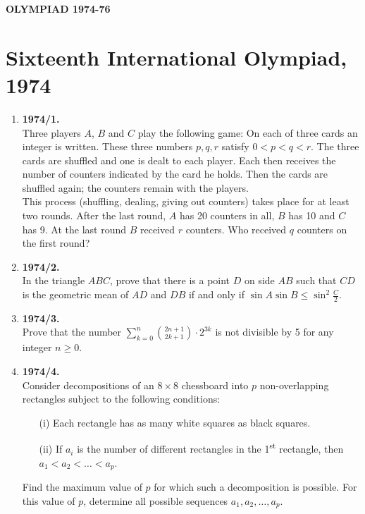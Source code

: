 \documentclass{article}
\begin{document}
\pagestyle{fancy}
\fancyhf{}

\begin{center}
\textbf{OLYMPIAD 1974-76}
\end{center}
\section*{Sixteenth International Olympiad, 1974}
\begin{enumerate}
\item\textbf{1974/1.} \\
Three players $A$, $B$ and $C$ play the following game: On each of three cards an integer is written. These three numbers $p, q, r$ satisfy $0 < p < q < r$. The three cards are shuffled and one is dealt to each player. Each then receives the number of counters indicated by the card he holds. Then the cards are shuffled again; the counters remain with the players. \\
This process (shuffling, dealing, giving out counters) takes place for at least two rounds. After the last round, $A$ has 20 counters in all, $B$ has 10 and $C$ has 9. At the last round $B$ received $r$ counters. Who received $q$ counters on the first round?

\bigskip

\item\textbf{1974/2.} \\
In the triangle $ABC$, prove that there is a point $D$ on side $AB$ such that $CD$ is the geometric mean of $AD$ and $DB$ if and only if
$
\sin A \sin B \leq \sin^2 \frac{C}{2}.
$

\bigskip

\item\textbf{1974/3.} \\
Prove that the number
$
\sum_{k=0}^{n} \binom{2n+1}{2k+1} \cdot 2^{3k}
$
is not divisible by 5 for any integer $n \geq 0$.

\bigskip

\item\textbf{1974/4.} \\
Consider decompositions of an $8 \times 8$ chessboard into $p$ non-overlapping rectangles subject to the following conditions:
\begin{itemize}
  \item[(i)] Each rectangle has as many white squares as black squares.
  \item[(ii)] If $a_i$ is the number of different rectangles in the 1\textsuperscript{st} rectangle, then $a_1 < a_2 < \dots < a_p$. 
\end{itemize}
Find the maximum value of $p$ for which such a decomposition is possible. For this value of $p$, determine all possible sequences $a_1, a_2, \dots, a_p$.


\end{enumerate}
\end{document}
